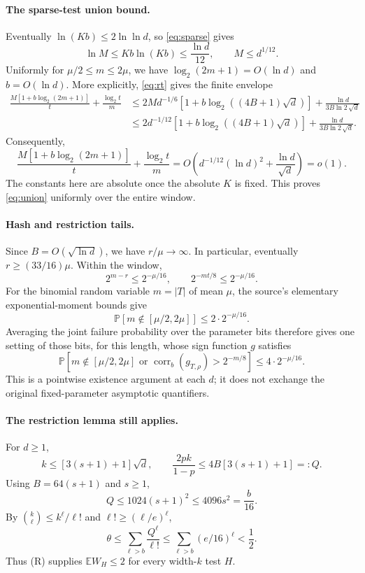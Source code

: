 \documentclass[11pt]{article}
\newcommand{\E}{\mathbb E}
\newcommand{\Prb}{\mathbb P}
\newcommand{\corr}{\operatorname{corr}}
\begin{document}
\paragraph{The sparse-test union bound.}
Eventually $\ln(Kb)\le2\ln\ln d$, so \eqref{eq:sparse} gives
\[
 \ln M\le Kb\ln(Kb)\le\frac{\ln d}{12},\qquad M\le d^{1/12}.
\]
Uniformly for $\mu/2\le m\le2\mu$, we have
$\log_2(2m+1)=O(\ln d)$ and $b=O(\ln d)$.
More explicitly, \eqref{eq:rt} gives the finite envelope
\begin{align*}
 \frac{M[1+b\log_2(2m+1)]}{t}+\frac{\log_2t}{m}
 &\le 2M d^{-1/6}
       [1+b\log_2((4B+1)\sqrt d)]
       +\frac{\ln d}{3B\ln2\,\sqrt d}\\
 &\le 2d^{-1/12}
       [1+b\log_2((4B+1)\sqrt d)]
       +\frac{\ln d}{3B\ln2\,\sqrt d}.
\end{align*}
Consequently,
\[
 \frac{M[1+b\log_2(2m+1)]}{t}
       +\frac{\log_2t}{m}
 =O\!\left(d^{-1/12}(\ln d)^2
                   +\frac{\ln d}{\sqrt d}\right)=o(1).
\]
The constants here are absolute once the absolute $K$ is fixed.
This proves \eqref{eq:union} uniformly over the entire window.

\paragraph{Hash and restriction tails.}
Since $B=O(\sqrt{\ln d})$, we have $r/\mu\to\infty$.
In particular, eventually $r\ge(33/16)\mu$. Within the window,
\[
 2^{m-r}\le2^{-\mu/16},\qquad
 2^{-mt/8}\le2^{-\mu/16}.
\]
For the binomial random variable $m=|T|$ of mean $\mu$, the source's
elementary exponential-moment bounds give
\[
 \Prb[m\notin[\mu/2,2\mu]]\le2\cdot2^{-\mu/16}.
\]
Averaging the joint failure probability over the parameter bits therefore
gives one setting of those bits, for this length, whose sign function $g$
satisfies
\begin{equation}\label{eq:good}
 \Prb\left[m\notin[\mu/2,2\mu]
       \text{ or }\corr_b(g_{T,\rho})>2^{-m/8}\right]
       \le4\cdot2^{-\mu/16}.
\end{equation}
This is a pointwise existence argument at each $d$; it does not exchange
the original fixed-parameter asymptotic quantifiers.

\paragraph{The restriction lemma still applies.}
For $d\ge1$,
\[
 k\le[3(s+1)+1]\sqrt d,\qquad
 \frac{2pk}{1-p}\le4B[3(s+1)+1]=:Q.
\]
Using $B=64(s+1)$ and $s\ge1$,
\[
 Q\le1024(s+1)^2\le4096s^2=\frac b{16}.
\]
By $\binom{k}{\ell}\le k^\ell/\ell!$ and
$\ell!\ge(\ell/e)^\ell$,
\[
 \theta\le\sum_{\ell>b}\frac{Q^\ell}{\ell!}
 \le\sum_{\ell>b}(e/16)^\ell<\frac12.
\]
Thus (R) supplies $\E W_H\le2$ for every width-$k$ test $H$.
\end{document}
